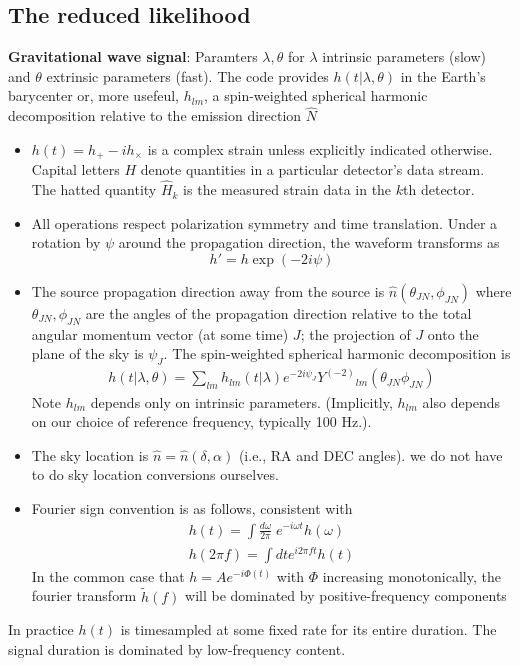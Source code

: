 \documentclass[twocolumn,prd,nofootinbib]{revtex4}
\newcommand\Y[1]{Y^{(#1)}{}}
\begin{document}
\subsection{The reduced likelihood}
\noindent \textbf{Gravitational wave signal}: Paramters $\lambda,\theta$ for $\lambda$ intrinsic parameters (slow) and
$\theta$ extrinsic parameters (fast).  The code provides $h(t|\lambda,\theta)$ in the Earth's barycenter or, more
usefeul, $h_{lm}$, a spin-weighted spherical harmonic decomposition relative to the emission direction $\hat{N}$
\begin{shaded}
\begin{itemize}
\item $h(t)=h_+-i h_\times$ is a complex strain unless explicitly indicated otherwise.   Capital letters $H$ denote
  quantities in a particular detector's data stream.  The hatted quantity $\hat{H}_k$ is the measured strain data in the
  $k$th detector.
\item All operations respect polarization symmetry and time translation.  Under a rotation by $\psi$ around the
  propagation direction, the waveform transforms as
\[
h' = h \exp(-2i \psi)
\]
\item The source propagation direction away from the source is $\hat{n}(\theta_{JN},\phi_{JN})$ where
  $\theta_{JN},\phi_{JN}$ are the angles of the propagation direction relative to the total angular momentum vector (at
  some time) $J$; the projection of $J$
  onto the plane of the sky is $\psi_J$.  The spin-weighted
  spherical harmonic decomposition is 
\begin{eqnarray}
\label{eq:def:hSpinWeightEmissionDirection}
h(t|\lambda,\theta) = \sum_{lm} h_{lm}(t|\lambda) e^{-2i\psi_J}\Y{-2}_{lm}(\theta_{JN}\phi_{JN})
\end{eqnarray}
Note $h_{lm}$ depends only on intrinsic parameters.  (Implicitly, $h_{lm}$ also depends on our choice of reference
frequency, typically 100 Hz.).
\item The sky location is $\hat{n}=\hat{n}(\delta,\alpha)$ (i.e., RA and DEC angles).  we do not have to do sky location
  conversions ourselves.
\item Fourier sign convention is as follows, consistent with \cite{gwastro-mergers-nr-Alignment-ROS-Polarization}
\begin{eqnarray}
h(t) = \int \frac{d \omega}{2\pi} \; e^{-i\omega t} h(\omega) \\
h(2\pi f) = \int dt e^{i 2\pi f t} h(t)
\end{eqnarray}
In the common case that  $h = Ae^{-i\Phi(t)}$ with $\Phi$ increasing monotonically, the fourier transform $\tilde{h}(f)$ will be dominated by
positive-frequency components
\end{itemize}
In practice $h(t)$ is timesampled at some fixed rate for its entire duration.  The signal duration is dominated by
low-frequency content.
\end{shaded}
\end{document}
